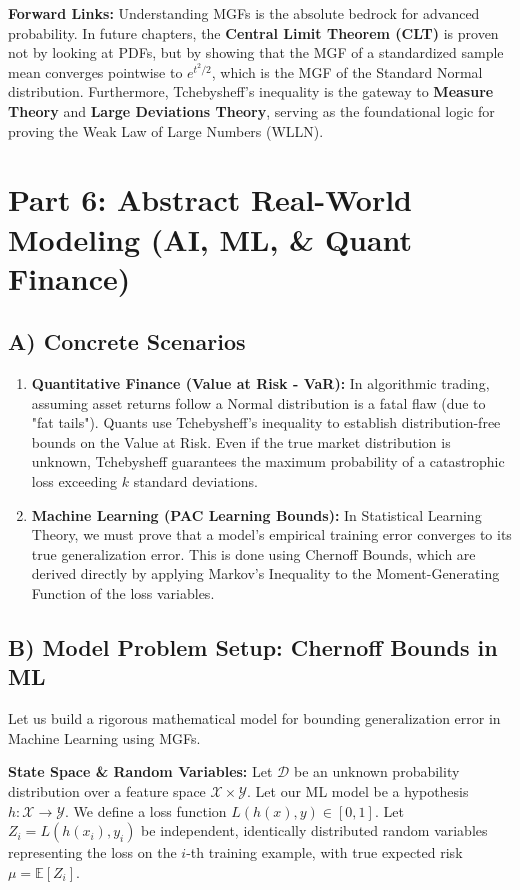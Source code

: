 \documentclass[11pt, a4paper]{article}
\theoremstyle{definition}
\theoremstyle{remark}
\newcommand{\E}{\mathbb{E}}
\begin{document}
\textbf{Forward Links:} Understanding MGFs is the absolute bedrock for advanced probability. In future chapters, the \textbf{Central Limit Theorem (CLT)} is proven not by looking at PDFs, but by showing that the MGF of a standardized sample mean converges pointwise to $e^{t^2/2}$, which is the MGF of the Standard Normal distribution. Furthermore, Tchebysheff's inequality is the gateway to \textbf{Measure Theory} and \textbf{Large Deviations Theory}, serving as the foundational logic for proving the Weak Law of Large Numbers (WLLN).

\section{Part 6: Abstract Real-World Modeling (AI, ML, \& Quant Finance)}

\subsection{A) Concrete Scenarios}
\begin{enumerate}
    \item \textbf{Quantitative Finance (Value at Risk - VaR):} In algorithmic trading, assuming asset returns follow a Normal distribution is a fatal flaw (due to "fat tails"). Quants use Tchebysheff's inequality to establish distribution-free bounds on the Value at Risk. Even if the true market distribution is unknown, Tchebysheff guarantees the maximum probability of a catastrophic loss exceeding $k$ standard deviations.
    \item \textbf{Machine Learning (PAC Learning Bounds):} In Statistical Learning Theory, we must prove that a model's empirical training error converges to its true generalization error. This is done using Chernoff Bounds, which are derived directly by applying Markov's Inequality to the Moment-Generating Function of the loss variables.
\end{enumerate}

\subsection{B) Model Problem Setup: Chernoff Bounds in ML}
Let us build a rigorous mathematical model for bounding generalization error in Machine Learning using MGFs.

\textbf{State Space \& Random Variables:} Let $\mathcal{D}$ be an unknown probability distribution over a feature space $\mathcal{X} \times \mathcal{Y}$. Let our ML model be a hypothesis $h: \mathcal{X} \to \mathcal{Y}$. We define a loss function $L(h(x), y) \in [0, 1]$. 
Let $Z_i = L(h(x_i), y_i)$ be independent, identically distributed random variables representing the loss on the $i$-th training example, with true expected risk $\mu = \E[Z_i]$.
\end{document}
